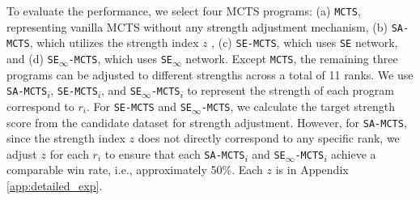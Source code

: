 
%




To evaluate the performance, we select four MCTS programs: (a) \texttt{MCTS}, representing vanilla MCTS without any strength adjustment mechanism, (b) \texttt{SA-MCTS}, which utilizes the strength index $z$ \citep{wu_strength_2019}, (c) \texttt{SE-MCTS}, which uses \texttt{SE} network, and (d) \texttt{SE\textsubscript{$\infty$}-MCTS}, which uses \texttt{SE\textsubscript{$\infty$}} network.
Except \texttt{MCTS}, the remaining three programs can be adjusted to different strengths across a total of 11 ranks.
We use \texttt{SA-MCTS\textsubscript{$i$}}, \texttt{SE-MCTS\textsubscript{$i$}}, and \texttt{SE\textsubscript{$\infty$}-MCTS\textsubscript{$i$}} to represent the strength of each program correspond to $r_i$.
For \texttt{SE-MCTS} and \texttt{SE\textsubscript{$\infty$}-MCTS}, we calculate the target strength score from the candidate dataset for strength adjustment.
However, for \texttt{SA-MCTS}, since the strength index $z$ does not directly correspond to any specific rank, we adjust $z$ for each $r_i$ to ensure that each \texttt{SA-MCTS\textsubscript{$i$}} and \texttt{SE\textsubscript{$\infty$}-MCTS\textsubscript{$i$}} achieve a comparable win rate, i.e., approximately 50\%.
Each $z$ is in Appendix \ref{app:detailed_exp}.

